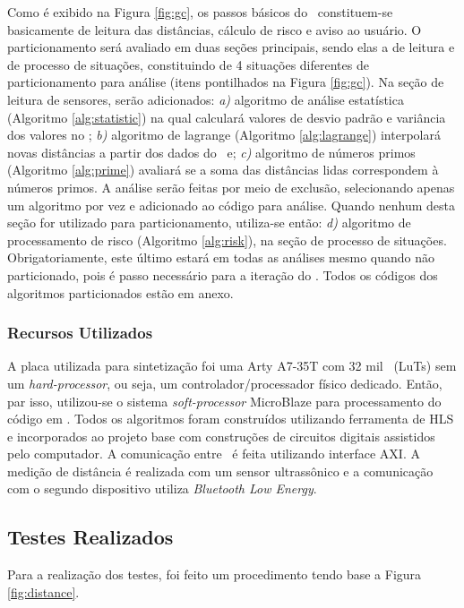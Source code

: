         Como é exibido na Figura \ref{fig:gc}, os passos básicos do \wearable\ constituem-se basicamente de leitura das distâncias, cálculo de risco e aviso ao usuário.
        O particionamento será avaliado em duas seções principais, sendo elas a de leitura e de processo de situações, constituindo de 4 situações diferentes de particionamento para análise (itens pontilhados na Figura \ref{fig:gc}).
        Na seção de leitura de sensores, serão adicionados: \textit{a)} algoritmo de análise estatística (Algoritmo \ref{alg:statistic}) na qual calculará valores de desvio padrão e variância dos valores no \buffer; \textit{b)} algoritmo de lagrange (Algoritmo \ref{alg:lagrange}) interpolará novas distâncias a partir dos dados do \buffer\ e; \textit{c)} algoritmo de números primos (Algoritmo \ref{alg:prime}) avaliará se a soma das distâncias lidas correspondem à números primos.
        A análise serão feitas por meio de exclusão, selecionando apenas um algoritmo por vez e adicionado ao código para análise.
        Quando nenhum desta seção for utilizado para particionamento, utiliza-se então: \textit{d)} algoritmo de processamento de risco (Algoritmo \ref{alg:risk}), na seção de processo de situações.
        Obrigatoriamente, este último estará em todas as análises mesmo quando não particionado, pois é passo necessário para a iteração do \wearable.
        Todos os códigos dos algoritmos particionados estão em anexo.
        
    
        \subsubsection{Recursos Utilizados}
            A placa utilizada para sintetização foi uma Arty A7-35T com 32 mil \luts\ (LuTs) sem um \textit{hard-processor}, ou seja, um controlador/processador físico dedicado.
            Então, par isso, utilizou-se o sistema \textit{soft-processor} MicroBlaze para processamento do código em \software.
            Todos os algoritmos foram construídos utilizando ferramenta de HLS e incorporados ao projeto base com construções de circuitos digitais assistidos pelo computador.
            A comunicação entre \hs\ é feita utilizando interface AXI.
            A medição de distância é realizada com um sensor ultrassônico e a comunicação com o segundo dispositivo utiliza \textit{Bluetooth Low Energy}.
        
        
    \subsection{Testes Realizados}
        Para a realização dos testes, foi feito um procedimento tendo base a Figura \ref{fig:distance}. 
        
